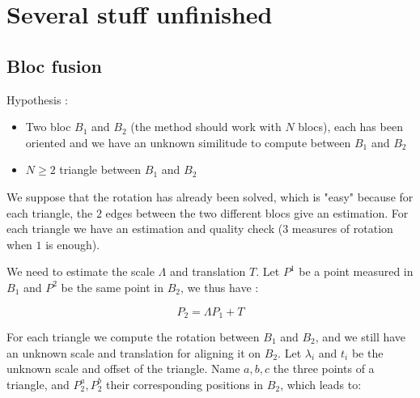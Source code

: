 

\chapter{Several stuff unfinished}





\section{Bloc fusion}

Hypothesis :

\begin{itemize}
    \item Two bloc $B_1$ and $B_2$  (the method should work with $N$ blocs),
          each has been oriented and we have an unknown similitude to compute between $B_1$ and $B_2$

    \item $N\geq 2$ triangle between $B_1$ and $B_2$
\end{itemize}

We suppose that the rotation has already been solved, which is "easy" because for each triangle,
the $2$ edges between the two different blocs give an estimation.  For each triangle we have an estimation
and quality check ($3$ measures of rotation when $1$ is enough). 

We need to estimate the scale $\Lambda$ and translation $T$. 
Let $P^1$  be a point measured in $B_1$ and $P^2$ be the same point in $B_2$, 
we thus have :

\begin{equation}
	P_2 = \Lambda P_1 + T \label{Eq:Bloc12}
\end{equation}

For each triangle we compute the rotation between $B_1$ and $B_2$, and we still
have an unknown scale and translation for aligning it on $B_2$.
Let $\lambda_i$ and $t_i$  be the unknown scale and offset of the triangle.
Name $a,b,c$ the three points of a triangle, and $P^a_2, P^b_2 $ their corresponding positions
in $B_2$, which leads to:

